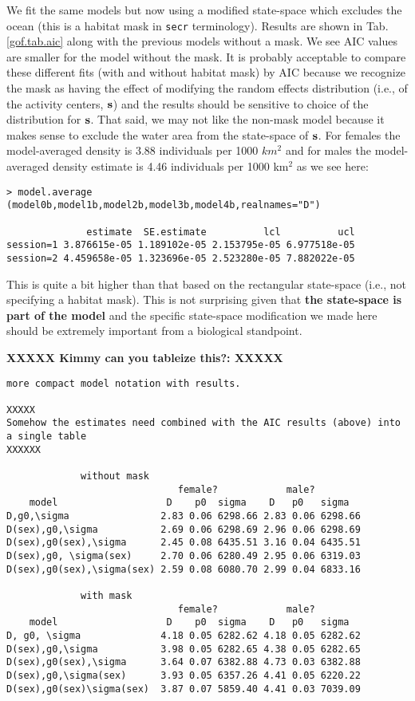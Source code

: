 We fit the same models but now using a modified state-space which
excludes the ocean (this is a habitat mask in \mbox{\tt secr} terminology).
Results are shown in Tab. \ref{gof.tab.aic}
along with the previous models without a mask. 
We see AIC values are smaller for the model without the mask. It is
probably acceptable to
compare these different fits (with and without habitat mask) by AIC
 because we recognize the mask as having the effect of modifying the
 random 
effects distribution (i.e., of the activity centers, ${\bf s}$) and the results
should be sensitive to choice of the distribution for ${\bf s}$. That
said, we may not like the non-mask model because it makes sense to 
exclude the water area from the state-space  of ${\bf s}$.
For females the model-averaged density is 3.88 individuals per 1000 $km^2$ and for
males the model-averaged density estimate is 4.46 individuals per
1000 km$^2$ as we see here:
{\small
\begin{verbatim}
> model.average (model0b,model1b,model2b,model3b,model4b,realnames="D")

              estimate  SE.estimate          lcl          ucl
session=1 3.876615e-05 1.189102e-05 2.153795e-05 6.977518e-05
session=2 4.459658e-05 1.323696e-05 2.523280e-05 7.882022e-05
\end{verbatim}
}
This is quite a bit higher than that based on the rectangular state-space
(i.e., not specifying a habitat mask). This is not surprising given
that {\bf the state-space is part of the model} and the specific
state-space modification we made here should be extremely important
from a biological standpoint.

{\bf XXXXX Kimmy can you tableize this?: XXXXX}
\begin{verbatim}
more compact model notation with results.

XXXXX
Somehow the estimates need combined with the AIC results (above) into
a single table 
XXXXXX

             without mask
                              female?            male?
    model                   D    p0  sigma    D   p0   sigma
D,g0,\sigma                2.83 0.06 6298.66 2.83 0.06 6298.66
D(sex),g0,\sigma           2.69 0.06 6298.69 2.96 0.06 6298.69
D(sex),g0(sex),\sigma      2.45 0.08 6435.51 3.16 0.04 6435.51
D(sex),g0, \sigma(sex)     2.70 0.06 6280.49 2.95 0.06 6319.03
D(sex),g0(sex),\sigma(sex) 2.59 0.08 6080.70 2.99 0.04 6833.16

             with mask 
                              female?            male?
    model                   D    p0  sigma    D   p0   sigma
D, g0, \sigma              4.18 0.05 6282.62 4.18 0.05 6282.62
D(sex),g0,\sigma           3.98 0.05 6282.65 4.38 0.05 6282.65
D(sex),g0(sex),\sigma      3.64 0.07 6382.88 4.73 0.03 6382.88
D(sex),g0,\sigma(sex)      3.93 0.05 6357.26 4.41 0.05 6220.22
D(sex),g0(sex)\sigma(sex)  3.87 0.07 5859.40 4.41 0.03 7039.09
\end{verbatim}





